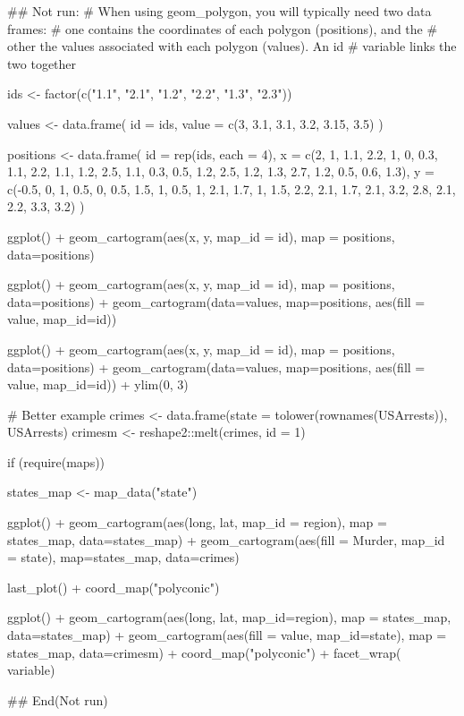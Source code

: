 \documentclass[a4paper]{book}
\begin{document}
\begin{Examples}
\begin{ExampleCode}
## Not run: 
# When using geom_polygon, you will typically need two data frames:
# one contains the coordinates of each polygon (positions),  and the
# other the values associated with each polygon (values).  An id
# variable links the two together

ids <- factor(c("1.1", "2.1", "1.2", "2.2", "1.3", "2.3"))

values <- data.frame(
  id = ids,
  value = c(3, 3.1, 3.1, 3.2, 3.15, 3.5)
)

positions <- data.frame(
  id = rep(ids, each = 4),
  x = c(2, 1, 1.1, 2.2, 1, 0, 0.3, 1.1, 2.2, 1.1, 1.2, 2.5, 1.1, 0.3,
  0.5, 1.2, 2.5, 1.2, 1.3, 2.7, 1.2, 0.5, 0.6, 1.3),
  y = c(-0.5, 0, 1, 0.5, 0, 0.5, 1.5, 1, 0.5, 1, 2.1, 1.7, 1, 1.5,
  2.2, 2.1, 1.7, 2.1, 3.2, 2.8, 2.1, 2.2, 3.3, 3.2)
)

ggplot() +
  geom_cartogram(aes(x, y, map_id = id), map = positions, data=positions)

ggplot() +
  geom_cartogram(aes(x, y, map_id = id), map = positions, data=positions) +
  geom_cartogram(data=values, map=positions, aes(fill = value, map_id=id))

ggplot() +
  geom_cartogram(aes(x, y, map_id = id), map = positions, data=positions) +
  geom_cartogram(data=values, map=positions, aes(fill = value, map_id=id)) +
  ylim(0, 3)

# Better example
crimes <- data.frame(state = tolower(rownames(USArrests)), USArrests)
crimesm <- reshape2::melt(crimes, id = 1)

if (require(maps)) {

  states_map <- map_data("state")

  ggplot() +
    geom_cartogram(aes(long, lat, map_id = region), map = states_map, data=states_map) +
    geom_cartogram(aes(fill = Murder, map_id = state), map=states_map, data=crimes)

  last_plot() + coord_map("polyconic")

  ggplot() +
    geom_cartogram(aes(long, lat, map_id=region), map = states_map, data=states_map) +
    geom_cartogram(aes(fill = value, map_id=state), map = states_map, data=crimesm) +
    coord_map("polyconic") +
    facet_wrap( ~ variable)
}

## End(Not run)
\end{ExampleCode}
\end{Examples}
%
\end{document}

